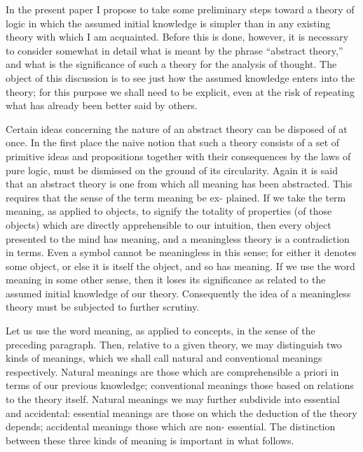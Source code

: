 \documentclass[9pt, twoside]{extarticle}
\begin{document}
In the present paper I propose to take some preliminary steps toward a
theory of logic in which the assumed initial knowledge is simpler than in
any existing theory with which I am acquainted. Before this is done, however,
it is necessary to consider somewhat in detail what is meant by the phrase
``abstract theory,'' and what is the significance of such a theory for the
analysis of thought. The object of this discussion is to see just how the
assumed knowledge enters into the theory; for this purpose we shall need to
be explicit, even at the risk of repeating what has already been better said
by others.

Certain ideas concerning the nature of an abstract theory can be disposed
of at once. In the first place the naive notion that such a theory consists of
a set of primitive ideas and propositions together with their consequences
by the laws of pure logic, must be dismissed on the ground of its circularity.
Again it is said that an abstract theory is one from which all meaning has
been abstracted. This requires that the sense of the term meaning be ex-
plained. If we take the term meaning, as applied to objects, to signify the
totality of properties (of those objects) which are directly apprehensible to
our intuition, then every object presented to the mind has meaning, and a
meaningless theory is a contradiction in terms. Even a symbol cannot be
meaningless in this sense; for either it denotes some object, or else it is
itself the object, and so has meaning. If we use the word meaning in some
other sense, then it loses its significance as related to the assumed initial
knowledge of our theory. Consequently the idea of a meaningless theory
must be subjected to further scrutiny.

Let us use the word meaning, as applied to concepts, in the sense of the
preceding paragraph. Then, relative to a given theory, we may distinguish
two kinds of meanings, which we shall call natural and conventional meanings
respectively. Natural meanings are those which are comprehensible a priori
in terms of our previous knowledge; conventional meanings those based on
relations to the theory itself. Natural meanings we may further subdivide
into essential and accidental: essential meanings are those on which the
deduction of the theory depends; accidental meanings those which are non-
essential. The distinction between these three kinds of meaning is important
in what follows.
\end{document}
